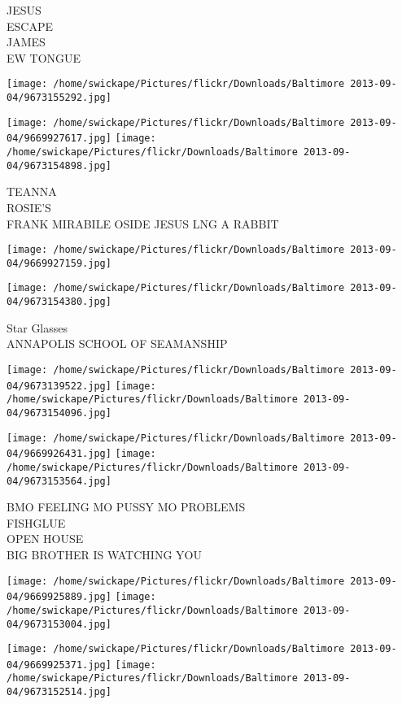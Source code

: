 \documentclass[10pt,letterpaper]{article}
\begin{document}
JESUS\\
ESCAPE\\
JAMES\\
EW TONGUE\\
\pagebreak

\texttt{[image: /home/swickape/Pictures/flickr/Downloads/Baltimore 2013-09-04/9673155292.jpg]}

\vspace{0.25in}
\texttt{[image: /home/swickape/Pictures/flickr/Downloads/Baltimore 2013-09-04/9669927617.jpg]}
\texttt{[image: /home/swickape/Pictures/flickr/Downloads/Baltimore 2013-09-04/9673154898.jpg]}

TEANNA\\
ROSIE'S\\
FRANK MIRABILE OSIDE JESUS LNG A RABBIT\\
\pagebreak

\texttt{[image: /home/swickape/Pictures/flickr/Downloads/Baltimore 2013-09-04/9669927159.jpg]}

\vspace{0.25in}
\texttt{[image: /home/swickape/Pictures/flickr/Downloads/Baltimore 2013-09-04/9673154380.jpg]}

Star Glasses\\
ANNAPOLIS SCHOOL OF SEAMANSHIP\\
\pagebreak

\texttt{[image: /home/swickape/Pictures/flickr/Downloads/Baltimore 2013-09-04/9673139522.jpg]}
\texttt{[image: /home/swickape/Pictures/flickr/Downloads/Baltimore 2013-09-04/9673154096.jpg]}

\texttt{[image: /home/swickape/Pictures/flickr/Downloads/Baltimore 2013-09-04/9669926431.jpg]}
\texttt{[image: /home/swickape/Pictures/flickr/Downloads/Baltimore 2013-09-04/9673153564.jpg]}

BMO FEELING MO PUSSY MO PROBLEMS\\
FISHGLUE\\
OPEN HOUSE\\
BIG BROTHER IS WATCHING YOU\\
\pagebreak

\texttt{[image: /home/swickape/Pictures/flickr/Downloads/Baltimore 2013-09-04/9669925889.jpg]}
\texttt{[image: /home/swickape/Pictures/flickr/Downloads/Baltimore 2013-09-04/9673153004.jpg]}

\texttt{[image: /home/swickape/Pictures/flickr/Downloads/Baltimore 2013-09-04/9669925371.jpg]}
\texttt{[image: /home/swickape/Pictures/flickr/Downloads/Baltimore 2013-09-04/9673152514.jpg]}
\end{document}

